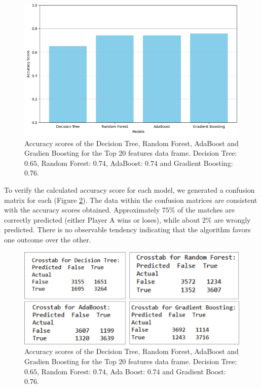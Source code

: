 \documentclass[preprint,aps,nofootinbib,a4paper,superscriptaddress,longbibliography,amsfonts,amssymb,amsmath,titlepage]{revtex4-2}
\begin{document}
%
\begin{figure}[h]
\includegraphics[width=\textwidth]{pictures/accuracy-score-models.png}
\caption{Accuracy scores of the Decision Tree, Random Forest, AdaBoost and Gradien Boosting for the Top 20 features data frame. Decision Tree: $0.65$, Random Forest: $0.74$, AdaBoost: $0.74$ and Gradient Boosting: $0.76$.}
\label{accuracy-score-models}
\end{figure}

To verify the calculated accuracy score for each model, we generated a confusion matrix for each (Figure \ref{confusion-matrix}). The data within the confusion matrices are consistent with the accuracy scores obtained. Approximately $75 \%$ of the matches are correctly predicted (either Player A wins or loses), while about $2 \%$ are wrongly predicted. There is no observable tendency indicating that the algorithm favors one outcome over the other.
%
\begin{figure}[h]
\includegraphics[width=\textwidth]{pictures/confusion-matrix.png}
\caption{Accuracy scores of the Decision Tree, Random Forest, AdaBoost and Gradien Boosting for the Top 20 features data frame. Decision Tree: $0.65$, Random Forest: $0.74$, Ada Boost: $0.74$ and Gradient Boost: $0.76$.}
\label{confusion-matrix}
\end{figure}
%
\end{document}
